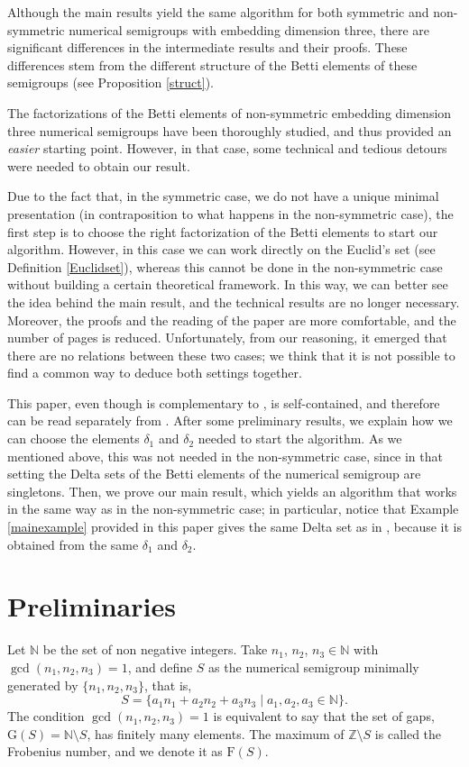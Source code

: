 \documentclass[11pt]{amsart}
\theoremstyle{remark}
\begin{document}
Although the main results yield the same algorithm for both symmetric and non-symmetric numerical semigroups with embedding dimension three, there are significant differences in the intermediate results and their proofs. These differences stem from the different structure of the Betti elements of these semigroups (see Proposition \ref{struct}). 

The factorizations of the Betti elements of non-symmetric embedding dimension three numerical semigroups have been thoroughly studied, and thus provided an \emph{easier} starting point. However, in that case, some technical and tedious detours were needed to obtain our result.


Due to the fact that, in the symmetric case, we do not have a unique minimal presentation (in contraposition to what happens in the non-symmetric case), the first step is to choose the right factorization of the Betti elements to start our algorithm. However, in this case we can work directly on the Euclid's set (see Definition \ref{Euclidset}), whereas this cannot be done in the non-symmetric case without building a certain theoretical framework. In this way, we can better see the idea behind the main result, and the technical results are no longer necessary. Moreover, the proofs and the reading of the paper are more comfortable, and the number of pages is reduced.  Unfortunately,
from our reasoning, it emerged that there are no relations between these two cases; we think that it is not possible to find a common way to deduce both settings together.

This paper, even though is complementary to \cite{G-SLM}, is self-contained, and therefore can be read separately from \cite{G-SLM}. After some preliminary results, we explain how we can choose the elements $\delta_1$ and $\delta_2$ needed to start the algorithm. As we mentioned above, this was not needed in the non-symmetric case, since in that setting the Delta sets of the Betti elements of the numerical semigroup are singletons. Then, we prove our main result, which yields an algorithm that works in the same way as in the non-symmetric case; in particular, notice that Example \ref{mainexample} provided in this paper gives the same Delta set as in \cite[Example 38]{G-SLM}, because it is obtained from the same $\delta_1$ and $\delta_2$.


\section{Preliminaries}
Let $\mathbb N$ be the set of non negative integers.
Take $n_1$, $n_2$, $n_3\in \mathbb N$ with $\gcd(n_1,n_2,n_3)=1$, and define $S$ as the numerical semigroup minimally generated by $\{n_1,n_2,n_3\}$, that is,
\[
S=\{a_1n_1+a_2n_2+a_3n_3 \mid a_1,a_2,a_3\in \mathbb N\}.
\] 
The condition $\gcd(n_1,n_2,n_3)=1$ is equivalent to say that the set of gaps, $\mathrm G(S)=\mathbb N\setminus S$, has finitely many elements. The maximum of $\mathbb Z\setminus S$ is called the Frobenius number, and we denote it as $\mathrm F(S)$.
\end{document}
